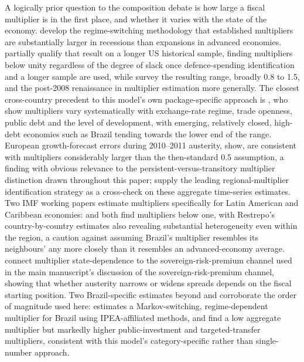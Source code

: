 \documentclass[11pt,a4paper]{article}
\begin{document}
A logically prior question to the composition debate is how large a fiscal multiplier is in the first place, and whether it varies with the state of the economy. \citet{auerbachgorodnichenko2012} develop the regime-switching methodology that established multipliers are substantially larger in recessions than expansions in advanced economies. \citet{rameyzubairy2018} partially qualify that result on a longer US historical sample, finding multipliers below unity regardless of the degree of slack once defence-spending identification and a longer sample are used, while \citet{ramey2011,ramey2019} survey the resulting range, broadly 0.8 to 1.5, and the post-2008 renaissance in multiplier estimation more generally. The closest cross-country precedent to this model's own package-specific approach is \citet{ilzetzkimendozavegh2013}, who show multipliers vary systematically with exchange-rate regime, trade openness, public debt and the level of development, with emerging, relatively closed, high-debt economies such as Brazil tending towards the lower end of the range. European growth-forecast errors during 2010--2011 austerity, \citet{blanchardleigh2013} show, are consistent with multipliers considerably larger than the then-standard 0.5 assumption, a finding with obvious relevance to the persistent-versus-transitory multiplier distinction drawn throughout this paper; \citet{nakamurasteinsson2014} supply the leading regional-multiplier identification strategy as a cross-check on these aggregate time-series estimates. Two IMF working papers estimate multipliers specifically for Latin American and Caribbean economies: \citet{carriereswallowdavidleigh2018} and \citet{restrepo2020} both find multipliers below one, with Restrepo's country-by-country estimates also revealing substantial heterogeneity even within the region, a caution against assuming Brazil's multiplier resembles its neighbours' any more closely than it resembles an advanced-economy average. \citet{bornmullerpfeifer2020} connect multiplier state-dependence to the sovereign-risk-premium channel used in the main manuscript's discussion of the sovereign-risk-premium channel, showing that whether austerity narrows or widens spreads depends on the fiscal starting position. Two Brazil-specific estimates beyond \citet{sanches2026} and \citet{carvalhosanches2019} corroborate the order of magnitude used here: \citet{pires2014} estimates a Markov-switching, regime-dependent multiplier for Brazil using IPEA-affiliated methods, and \citet{resendepires2021} find a low aggregate multiplier but markedly higher public-investment and targeted-transfer multipliers, consistent with this model's category-specific rather than single-number approach.
\end{document}
